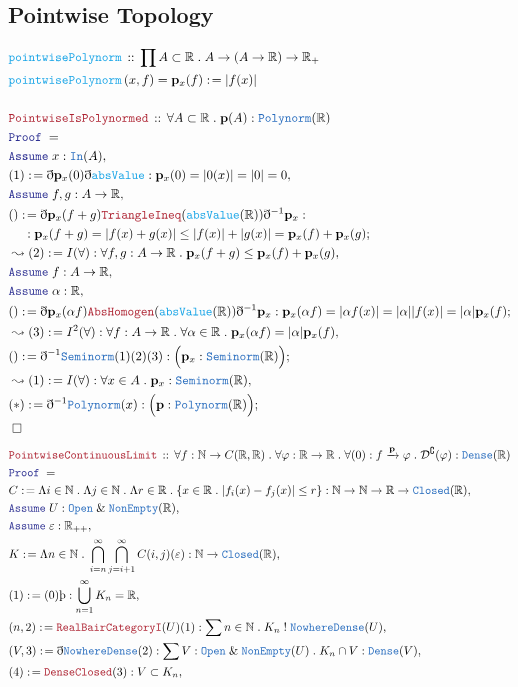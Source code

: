 \documentclass[12pt]{scrartcl}
\newcommand{\TYPE}[1]{\textcolor{NavyBlue}{\mathtt{#1}}}
\newcommand{\FUNC}[1]{\textcolor{Cerulean}{\mathtt{#1}}}
\newcommand{\LOGIC}[1]{\textcolor{Blue}{\mathtt{#1}}}
\newcommand{\THM}[1]{\textcolor{Maroon}{\mathtt{#1}}}
\renewcommand{\.}{\; . \;}
\newcommand{\de}{: \kern 0.1pc =}
\newcommand{\IsNot}{\; ! \;}
\newcommand{\Act}[1]{\left( #1 \right)}
\newcommand{\Theorem}[2]{& \THM{#1} \, :: \, #2 \\ & \Proof = \\ }
\newcommand{\DeclareFunc}[2]{& \FUNC{#1} \, :: \, #2 \\}
\newcommand{\DefineNamedFunc}[4]{&  \FUNC{#1}\Act{#2} = #3 \de #4 \\}
\newcommand{\NewLine}{\\ & \kern 1pc}
\newcommand{\Page}[1]{ \begin{align*} #1 \end{align*}   }
\newcommand{ \bd }{ \ByDef }
\renewcommand{\And}{\; \& \;}
\newcommand{\Reals}{\mathbb{R} }
\newcommand{\Nat}{\mathbb{N} }
\renewcommand{\c}{\complement}
\newcommand{\Say}[3]{& #1 \de #2 : #3, \\}
\newcommand{\Conclude}[3]{& #1 \de #2 : #3; \\}
\newcommand{\Derive}[3]{& \leadsto #1 \de #2 : #3, \\}
\newcommand{\Assume}[2]{& \LOGIC{Assume} \;#1 : #2, \\}
\newcommand{\QED}{\; \square}
\newcommand{\EndProof}{& \QED \\}
\newcommand{\ByDef}{\eth}
\newcommand{\ByConstr}{\text{\thorn}}
\newcommand{\Proof}{\LOGIC{Proof} \; }
\newcommand{\ND}{\TYPE{NowhereDense}}
\begin{document}
\subsection{Pointwise Topology}
\Page{
	\DeclareFunc{pointwisePolynorm}{ \prod A \subset \Reals \.  A \to (A \to \Reals) \to \Reals_{+}  }
	\DefineNamedFunc{pointwisePolynorm}{x,f}{\mathbf{p}_x(f)}{|f(x)|}
	\\
	\Theorem{PointwiseIsPolynormed}{\forall A \subset \Reals \. \mathbf{p}(A) : \TYPE{Polynorm}(\Reals)}
	\Assume{x}{\TYPE{In}(A)}
	\Say{(1)}{\bd \mathbf{p}_x(0) \bd \FUNC{absValue}}{ \mathbf{p}_x(0) = |0(x)| = |0| = 0  }
	\Assume{f,g}{A \to \Reals}	
	\Conclude{()}{
		\bd\mathbf{p}_x(f + g) \THM{TriangleIneq}(\FUNC{absValue}(\Reals)) \bd^{-1} \mathbf{p}_x 
	}{  \NewLine :
		\mathbf{p}_x(f + g) = |f(x) + g(x)| \le |f(x)| + |g(x)| = \mathbf{p}_x(f) + \mathbf{p}_x(g)}
	\Derive{(2)}{I(\forall)}{\forall f,g : A \to \Reals \. \mathbf{p}_x(f + g) \le \mathbf{p}_x(f) + \mathbf{p}_x(g)}
	\Assume{f}{A \to \Reals}
	\Assume{\alpha}{\Reals}
	\Conclude{()}{\bd \mathbf{p}_x(\alpha f) \THM{AbsHomogen}(\FUNC{absValue}(\Reals)) \bd^{-1} \mathbf{p}_x}
	{   \mathbf{p}_x(\alpha f) = |\alpha f(x)| = |\alpha||f(x)| = |\alpha|\mathbf{p}_x(f)      }
	\Derive{(3)}{I^2(\forall)}{\forall f : A \to \Reals \.  \forall \alpha \in \Reals \. \mathbf{p}_x(\alpha f) 
		= |\alpha| \mathbf{p}_x(f)
	}
	\Conclude{()}{\bd^{-1}\TYPE{Seminorm}(1)(2)(3)}{ \Big( \mathbf{p}_x : \TYPE{Seminorm}(\Reals) \Big)  }
	\Derive{(1)}{I(\forall)}{\forall x \in A \. \mathbf{p}_x : \TYPE{Seminorm}(\Reals)}
	\Conclude{(*)}{\bd^{-1} \TYPE{Polynorm}(x)}{\Big( \mathbf{p} : \TYPE{Polynorm}(\Reals) \Big)}
	\EndProof
}\Page{
	\Theorem{PointwiseContinuousLimit}{ 
	\forall f : \Nat \to C(\Reals,\Reals) \. \forall \varphi : \Reals \to \Reals  
		\. \forall (0) :  f \xrightarrow{\mathbf{p}} \varphi \.	\mathcal{D}^\c(\varphi) : \TYPE{Dense}(\Reals)
	}
	\Say{C}{\Lambda i \in \Nat \. \Lambda j \in \Nat \. \Lambda r \in \Reals \. 
		\{ x \in \Reals \. |f_i(x) - f_j(x)| \le r  \} }{ \Nat \to \Nat \to \Reals \to  \TYPE{Closed}(\Reals)   }
	\Assume{U}{\TYPE{Open} \And \TYPE{NonEmpty}(\Reals)}
	\Assume{\varepsilon}{\Reals_{++}}
	\Say{K}{ \Lambda n \in \Nat \. \bigcap^\infty_{i = n} \bigcap^\infty_{j = i + 1} C(i,j)(\varepsilon) }
	{ \Nat \to \TYPE{Closed}(\Reals)  }
	\Say{(1)}{(0)\ByConstr}{ \bigcup^\infty_{n=1} K_n = \Reals}
	\Say{(n,2)}{\THM{RealBairCategoryI}(U)(1)}{\sum n \in \Nat \. K_n \IsNot \ND(U)  }
	\Say{(V,3)}{\bd \ND(2)}{  \sum V : \TYPE{Open} \And \TYPE{NonEmpty}(U) \. K_n \cap V : \TYPE{Dense}(V) }
	\Say{(4)}{\THM{DenseClosed}(3)}{V \subset K_n}
}
\end{document}
